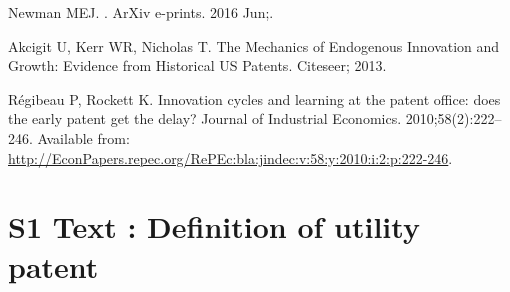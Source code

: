 \documentclass[12pt,twoside,a4paper]{article}
\begin{document}
\begin{thebibliography}{10}
{Newman} MEJ.
.
\newblock ArXiv e-prints. 2016 Jun;.

Akcigit U, Kerr WR, Nicholas T.
\newblock The Mechanics of Endogenous Innovation and Growth: Evidence from
  Historical US Patents.
\newblock Citeseer; 2013.

R{\'e}gibeau P, Rockett K.
\newblock Innovation cycles and learning at the patent office: does the early
  patent get the delay?
\newblock Journal of Industrial Economics. 2010;58(2):222--246.
\newblock Available from:
  \url{http://EconPapers.repec.org/RePEc:bla:jindec:v:58:y:2010:i:2:p:222-246}.

\end{thebibliography}




\newpage






\section*{S1 Text : Definition of utility patent} 
\end{document}
